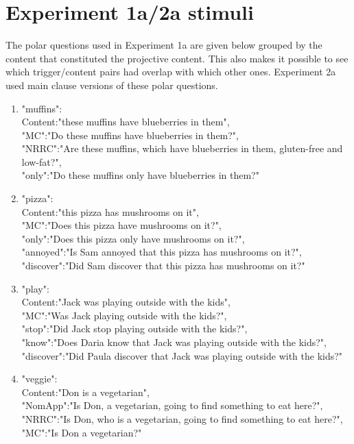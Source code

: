 \documentclass[11pt,fleqn]{article}
\newcommand{\6}{\mbox{$[\hspace*{-.6mm}[$}}
\newcommand{\9}{\mbox{$]\hspace*{-.6mm}]$}}
\begin{document}
\appendix

\section{Experiment 1a/2a stimuli}\label{a-exp1a-2a-stimuli}

The polar questions used in Experiment 1a are given below grouped by the content that constituted the projective content. This also makes it possible to see which trigger/content pairs had overlap with which other ones. Experiment 2a used main clause versions of these polar questions. 

\begin{enumerate}

\item  "muffins": \\
     Content:"these muffins have blueberries in them",\\
     "MC":"Do these muffins have blueberries in them?",\\
     "NRRC":"Are these muffins, which have blueberries in them, gluten-free and low-fat?",\\
     "only":"Do these muffins only have blueberries in them?"

\item "pizza": \\
     Content:"this pizza has mushrooms on it",\\
     "MC":"Does this pizza have mushrooms on it?",\\
     "only":"Does this pizza only have mushrooms on it?",\\
     "annoyed":"Is Sam annoyed that this pizza has mushrooms on it?",\\
     "discover":"Did Sam discover that this pizza has mushrooms on it?"

\item "play": \\
     Content:"Jack was playing outside with the kids",\\
     "MC":"Was Jack playing outside with the kids?",\\
     "stop":"Did Jack stop playing outside with the kids?",\\
     "know":"Does Daria know that Jack was playing outside with the kids?",\\
     "discover":"Did Paula discover that Jack was playing outside with the kids?"

\item "veggie": \\
     Content:"Don is a vegetarian",\\
     "NomApp":"Is Don, a vegetarian, going to find something to eat here?",\\
     "NRRC":"Is Don, who is a vegetarian, going to find something to eat here?",\\
     "MC":"Is Don a vegetarian?"


\end{enumerate}
\end{document}
